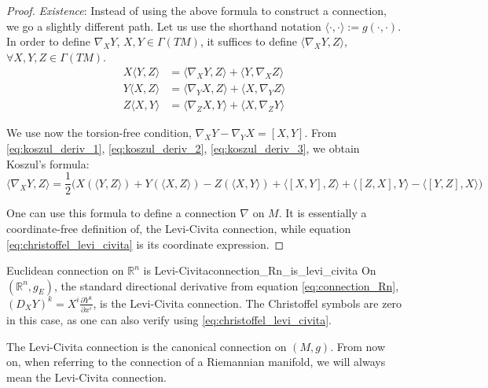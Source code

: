 \begin{proof}
\textit{Existence}:
Instead of using the above formula to construct a connection, we go a slightly different path. Let us use the shorthand notation $\langle \cdot, \cdot \rangle := g(\cdot, \cdot)$. In order to define $\nabla_X Y$, $X, Y \in \Gamma(TM)$, it suffices to define $\langle \nabla_X Y, Z \rangle$, $\forall X, Y, Z \in \Gamma(TM)$.
\begin{align}
X \langle Y, Z \rangle &= \langle \nabla_X Y, Z \rangle + \langle Y, \nabla_X Z \rangle \label{eq:koszul_deriv_1} \\
Y \langle X, Z \rangle &= \langle \nabla_Y X, Z \rangle + \langle X, \nabla_Y Z \rangle \label{eq:koszul_deriv_2} \\
Z \langle X, Y \rangle &= \langle \nabla_Z X, Y \rangle + \langle X, \nabla_Z Y \rangle \label{eq:koszul_deriv_3}
\end{align}

We use now the torsion-free condition, $\nabla_X Y - \nabla_Y X = [X, Y]$. From \eqref{eq:koszul_deriv_1}, \eqref{eq:koszul_deriv_2}, \eqref{eq:koszul_deriv_3}, we obtain Koszul's formula:
\[
\langle \nabla_X Y, Z \rangle
= \frac{1}{2} \Big(
    X(\langle Y, Z \rangle) + Y(\langle X, Z \rangle) - Z(\langle X, Y \rangle) + \langle [X, Y], Z \rangle + \langle [Z, X], Y \rangle - \langle [Y, Z], X \rangle \Big)
\]

One can use this formula to define a connection $\nabla$ on $M$. It is essentially a coordinate-free definition of, the Levi-Civita connection, while equation \eqref{eq:christoffel_levi_civita} is its coordinate expression.

\end{proof}


\begin{colexample}{Euclidean connection on $\mathbb{R}^n$ is Levi-Civita}{connection_Rn_is_levi_civita}
On $(\mathbb{R}^n, g_E)$, the standard directional derivative from equation \eqref{eq:connection_Rn}, $(D_X Y)^k = X^i \frac{\partial Y^k}{\partial x^i}$, is the Levi-Civita connection. The Christoffel symbols are zero in this case, as one can also verify using \eqref{eq:christoffel_levi_civita}.
\end{colexample}



\begin{colremark}
The Levi-Civita connection is the canonical connection on $(M, g)$. From now on, when referring to the connection of a Riemannian manifold, we will always mean the Levi-Civita connection.
\end{colremark}


